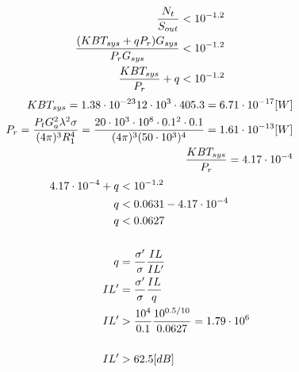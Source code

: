 \documentclass[12pt, letterpaper]{article}
\begin{document}
\begin{itemize}
  \begin{align*}
    {N_t\over S_{out}}<10^{-1.2}
    \\
    {(KBT_{sys}+qP_r)G_{sys}\over P_rG_{sys}}<10^{-1.2}
    \\
    {KBT_{sys}\over P_r}+q<10^{-1.2}
  \end{align*}
  \begin{align*}
    KBT_{sys}=1.38\cdot10^{-23}12\cdot10^3\cdot405.3=6.71\cdot10^{-17}[W]
    \\
    P_r
    =
    {P_tG_a^2\lambda^2\sigma\over(4\pi)^3R_1^4}=
    {20\cdot10^3\cdot10^8\cdot0.1^2\cdot0.1\over(4\pi)^3(50\cdot10^3)^4}=1.61\cdot10^{-13}[W]
    \\
    {KBT_{sys}\over P_r}=4.17\cdot10^{-4}
  \end{align*}
  \begin{align*}
    4.17\cdot10^{-4}+q&<10^{-1.2}
    \\
    q&<0.0631-4.17\cdot10^{-4}
    \\
    q&<0.0627
    \\\\
    q&={\sigma'\over \sigma}{IL\over IL'}
    \\
    IL'&={\sigma'\over \sigma}{IL\over q}
    \\
    IL'&>{10^4\over0.1}{10^{0.5/10}\over0.0627}=1.79\cdot10^6
    \\\\
    IL'&>62.5[dB]
  \end{align*}
\end{itemize}
\end{document}
